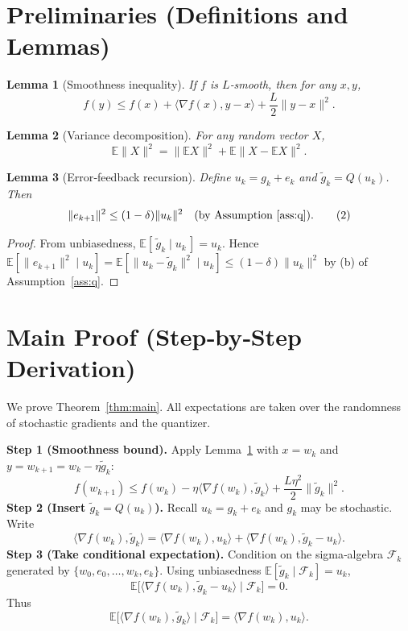 \documentclass{article}
\newtheorem{lemma}{Lemma}
\newcommand{\E}{\mathbb{E}}
\begin{document}
\newpage
\section*{Preliminaries (Definitions and Lemmas)}
\begin{lemma}[Smoothness inequality]\label{lem:smooth}
If $f$ is $L$‑smooth, then for any $x,y$,
\[
f(y)\le f(x)+\langle\nabla f(x),y-x\rangle+\frac{L}{2}\|y-x\|^{2}.
\]
\end{lemma}
\begin{lemma}[Variance decomposition]\label{lem:var}
For any random vector $X$,
\[
\E\|X\|^{2}= \|\E X\|^{2}+ \E\|X-\E X\|^{2}.
\]
\end{lemma}
\begin{lemma}[Error‑feedback recursion]\label{lem:ef}
Define $u_{k}=g_{k}+e_{k}$ and $\tilde g_{k}=Q(u_{k})$. Then
\[
\|e_{k+1}\|^{2}\le (1-\delta)\|u_{k}\|^{2}
\quad\text{(by Assumption~\ref{ass:q})}.
\tag{2}
\]
\end{lemma}
\begin{proof}
From unbiasedness, $\E[\,\tilde g_{k}\mid u_{k}\,]=u_{k}$.
Hence $\E[\|e_{k+1}\|^{2}\mid u_{k}]
 =\E[\|u_{k}-\tilde g_{k}\|^{2}\mid u_{k}]
 \le (1-\delta)\|u_{k}\|^{2}$ by (b) of Assumption~\ref{ass:q}.
\end{proof}

\section*{Main Proof (Step‑by‑Step Derivation)}
We prove Theorem~\ref{thm:main}. All expectations are taken over the randomness of stochastic gradients and the quantizer.

\noindent\textbf{Step 1 (Smoothness bound).}  
Apply Lemma~\ref{lem:smooth} with $x=w_{k}$ and $y=w_{k+1}=w_{k}-\eta\tilde g_{k}$:
\[
f(w_{k+1})\le f(w_{k})-\eta\langle\nabla f(w_{k}),\tilde g_{k}\rangle+\frac{L\eta^{2}}{2}\|\tilde g_{k}\|^{2}.
\tag{3}
\]
\noindent\textbf{Step 2 (Insert $\tilde g_{k}=Q(u_{k})$).}
Recall $u_{k}=g_{k}+e_{k}$ and $g_{k}$ may be stochastic. Write
\[
\langle\nabla f(w_{k}),\tilde g_{k}\rangle
= \langle\nabla f(w_{k}),u_{k}\rangle
   +\langle\nabla f(w_{k}),\tilde g_{k}-u_{k}\rangle .
\tag{4}
\]
\noindent\textbf{Step 3 (Take conditional expectation).}
Condition on the sigma‑algebra $\mathcal{F}_{k}$ generated by $\{w_{0},e_{0},\dots,w_{k},e_{k}\}$.
Using unbiasedness $\E[\tilde g_{k}\mid\mathcal{F}_{k}]=u_{k}$,
\[
\E\!\big[\langle\nabla f(w_{k}),\tilde g_{k}-u_{k}\rangle\mid\mathcal{F}_{k}\big]=0.
\tag{5}
\]
Thus
\[
\E\!\big[\langle\nabla f(w_{k}),\tilde g_{k}\rangle\mid\mathcal{F}_{k}\big]
= \langle\nabla f(w_{k}),u_{k}\rangle.
\tag{6}
\]
\end{document}
